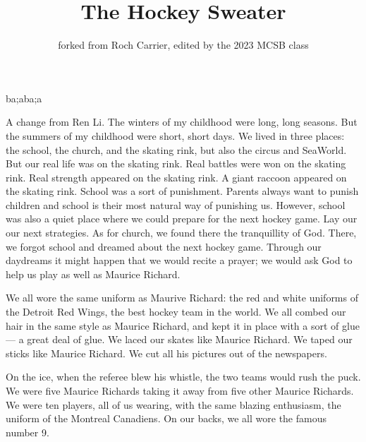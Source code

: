 \documentclass{article}
\title{The Hockey Sweater}
\author{forked from Roch Carrier, edited by the 2023 MCSB class}
\begin{document}
\maketitle
ba;aba;a

A change from Ren Li.
The winters of my childhood were long, long seasons.
But the summers of my childhood were short, short days.
We lived in three places: the school, the church, and the skating rink, but also the circus and SeaWorld.
But our real life was on the skating rink. 
Real battles were won on the skating rink.
Real strength appeared on the skating rink.
A giant raccoon appeared on the skating rink.
School was a sort of punishment.
Parents always want to punish children and school is their most natural way of punishing us.
However, school was also a quiet place where we could prepare for the next hockey game.
Lay our our next strategies.
As for church, we found there the tranquillity of God.
There, we forgot school and dreamed about the next hockey game.
Through our daydreams it might happen that we would recite a prayer;
we would ask God to help us play as well as Maurice Richard.

We all wore the same uniform as Maurive Richard: 
the red and white uniforms of the Detroit Red Wings, the best hockey team in the world.
We all combed our hair in the same style as Maurice Richard, 
and kept it in place with a sort of glue --- a great deal of glue.
We laced our skates like Maurice Richard.
We taped our sticks like Maurice Richard.
We cut all his pictures out of the newspapers.

On the ice, when the referee blew his whistle, the two teams would rush the puck.
We were five Maurice Richards taking it away from five other Maurice Richards.
We were ten players, all of us wearing, with the same blazing enthusiasm, the uniform of the Montreal Canadiens.
On our backs, we all wore the famous number 9.
\end{document}
